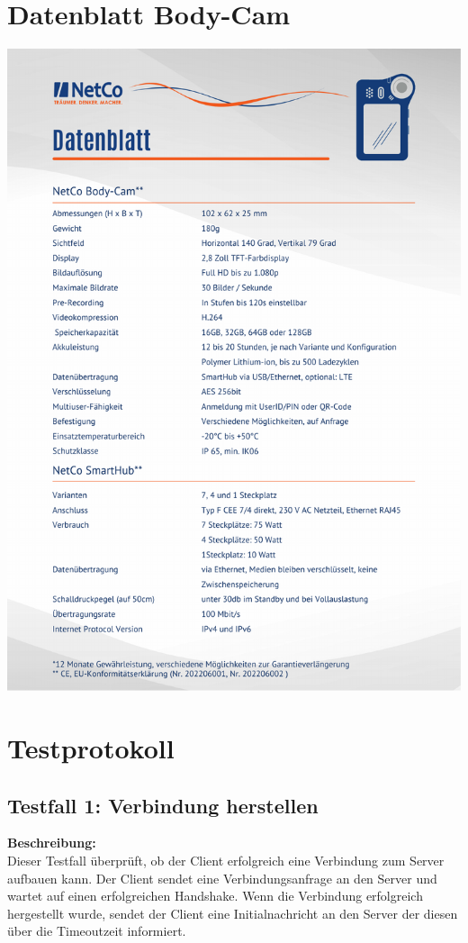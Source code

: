 \documentclass[thesis.tex]{subfiles}
\begin{document}
\section{Datenblatt Body-Cam}\label{anhang:datenblatt}

\includegraphics[page=1,width=\textwidth,height=.9\textheight,keepaspectratio]{../sources/Datenblatt_Bodycam.pdf}

\section{Testprotokoll}\label{anhang:testprotokoll}

\subsection*{Testfall 1: Verbindung herstellen}

\textbf{Beschreibung:}\\
Dieser Testfall überprüft, ob der Client erfolgreich eine Verbindung zum Server aufbauen kann. Der Client sendet eine Verbindungsanfrage an den Server und wartet auf einen erfolgreichen Handshake. Wenn die Verbindung erfolgreich hergestellt wurde, sendet der Client eine Initialnachricht an den Server der diesen über die Timeoutzeit informiert.
\end{document}
